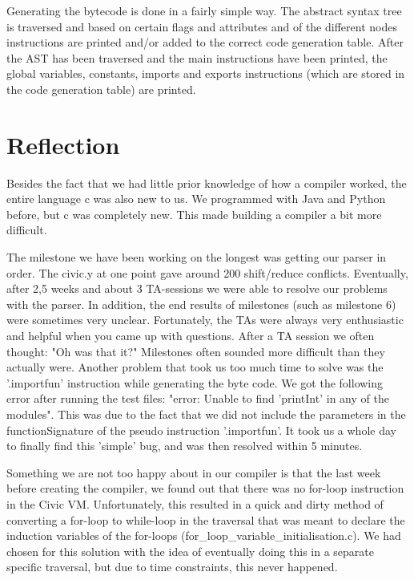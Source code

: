 \documentclass{uva-inf-article}
\begin{document}
\par Generating the bytecode is done in a fairly simple way.
The abstract syntax tree is traversed and based on certain flags and attributes and of the different 
nodes instructions are printed and/or added to the correct code generation table.
After the AST has been traversed and the main instructions have been printed, the global variables, constants, 
imports and exports instructions (which are stored in the code generation table) are printed.

\section{Reflection}
\par Besides the fact that we had little prior knowledge of how a compiler worked, the entire language c was also new to us.
We programmed with Java and Python before, but c was completely new. This made building a compiler a bit more difficult.

The milestone we have been working on the longest was getting our parser in order.
The civic.y at one point gave around 200 shift/reduce conflicts. Eventually, after 2,5 weeks and about 3 TA-sessions we were able to resolve our problems with the parser.
In addition, the end results of milestones (such as milestone 6) were sometimes very unclear. Fortunately, the TAs were always very enthusiastic and helpful when you came up with questions. 
After a TA session we often thought: "Oh was that it?" Milestones often sounded more difficult than they actually were.
Another problem that took us too much time to solve was the '.importfun' instruction while generating the byte code. 
We got the following error after running the test files: "error: Unable to find 'printInt' in any of the modules". 
This was due to the fact that we did not include the parameters in the functionSignature of the pseudo instruction '.importfun'. 
It took us a whole day to finally find this 'simple' bug, and was then resolved within 5 minutes.

Something we are not too happy about in our compiler is that the last week before creating the compiler, we found out that there was no for-loop instruction in the Civic VM. 
Unfortunately, this resulted in a quick and dirty method of converting a for-loop to while-loop in the traversal that was meant to declare the induction variables of the for-loops 
(for\_loop\_variable\_initialisation.c). 
We had chosen for this solution with the idea of eventually doing this in a separate specific traversal, 
but due to time constraints, this never happened.
\end{document}
